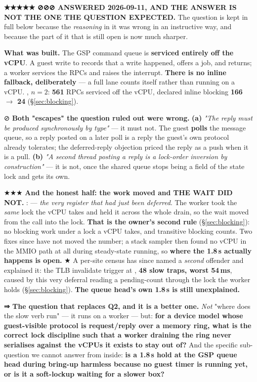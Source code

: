 \documentclass[10.5pt]{article}
\begin{document}
\begin{warnbox}\small
\textbf{★★★★★ ⊘⊘⊘ ANSWERED 2026-09-11, AND THE ANSWER IS NOT THE ONE THE QUESTION EXPECTED.} The
question is kept in full below because the \emph{reasoning} in it was wrong in an instructive way,
and because the part of it that is still open is now much sharper.

\smallskip
\textbf{What was built.} The GSP command queue is \textbf{serviced entirely off the vCPU}. A
guest write to  records that a write happened, offers a job, and
returns; a worker services the RPCs and raises the interrupt. \textbf{There is no inline
fallback, deliberately} --- a full lane counts itself rather than running on a vCPU.
\measured{} , $n=2$: \textbf{561} RPCs serviced off the vCPU, declared inline blocking
\textbf{166 $\to$ 24} (\S\ref{sec:blocking}).

\smallskip
⊘ \textbf{Both "escapes" the question ruled out were wrong.} \textbf{(a)} \emph{"The reply must be
produced synchronously by type"} --- it must not. The guest \textbf{polls} the message queue, so
a reply posted on a later poll is a reply the guest's own protocol already tolerates; the
deferred-reply objection priced the reply as a push when it is a pull. \textbf{(b)} \emph{"A
second thread posting a reply is a lock-order inversion by construction"} --- it is not, once the
shared queue stops being a field of the state lock and gets its own.

\smallskip
★★★ \textbf{And the honest half: the work moved and THE WAIT DID NOT.} \measured{} :
 --- \emph{the very register that had
just been deferred}. The worker took the \emph{same} lock the vCPU takes and held it across the
whole drain, so the wait moved from the call into the lock. \textbf{That is the owner's second
rule} (\S\ref{sec:blocking}): no blocking work under a lock a vCPU takes, and transitive blocking
counts. Two fixes since have not moved the number; a stack sampler then found no vCPU in the MMIO
path at all during steady-state running, so \textbf{where the 1.8\,s actually happens is open.}
★ A per-site census has since named a \emph{second} offender and explained it: the TLB invalidate
trigger at , \textbf{48 slow traps, worst 54\,ms}, caused by this very
deferral reading a pending-count through the lock the worker holds (\S\ref{sec:blocking}).
\textbf{The queue head's own 1.8\,s is still unexplained.}

\smallskip
\textbf{⇒ The question that replaces Q2, and it is a better one.} \emph{Not} "where does the slow
verb run" --- it runs on a worker --- but: \textbf{for a device model whose guest-visible protocol
is request/reply over a memory ring, what is the correct lock discipline such that a worker
draining the ring never serialises against the vCPUs it exists to stay out of?} And the specific
sub-question we cannot answer from inside: \textbf{is a 1.8\,s hold at the GSP queue head during
bring-up harmless because no guest timer is running yet, or is it a soft-lockup waiting for a
slower box?}


\end{warnbox}
\end{document}
